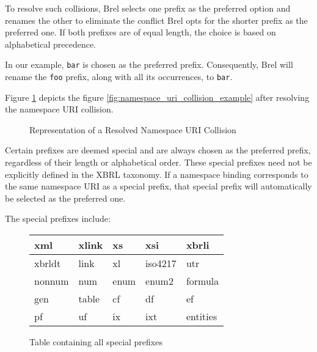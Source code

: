 To resolve such collisions, Brel selects one prefix as the preferred option and renames the other to eliminate the conflict
Brel opts for the shorter prefix as the preferred one.
If both prefixes are of equal length, the choice is based on alphabetical precedence.

In our example, \texttt{bar} is chosen as the preferred prefix.
Consequently, Brel will rename the \texttt{foo} prefix, along with all its occurrences, to \texttt{bar}.

Figure \ref{fig:namespace_uri_collision_example_renamed} depicts the figure \ref{fig:namespace_uri_collision_example} after resolving the namespace URI collision.

\begin{figure}[H]
\caption{Representation of a Resolved Namespace URI Collision}
\label{fig:namespace_uri_collision_example_renamed}
\end{figure}

Certain prefixes are deemed special and are always chosen as the preferred prefix, regardless of their length or alphabetical order.
These special prefixes need not be explicitly defined in the XBRL taxonomy.
If a namespace binding corresponds to the same namespace URI as a special prefix, that special prefix will automatically be selected as the preferred one.

The special prefixes include:

\begin{figure}[H]
    \centering
    \begin{tabular}{|l|l|l|l|l|}
        \hline
        xml & xlink & xs & xsi & xbrli \\
        \hline
        xbrldt & link & xl & iso4217 & utr \\
        \hline
        nonnum & num & enum & enum2 & formula \\
        \hline
        gen & table & cf & df & ef \\
        \hline
        pf & uf & ix & ixt & entities \\
        \hline
    \end{tabular}
    \caption{Table containing all special prefixes}
    \label{fig:special_prefixes}
\end{figure}

